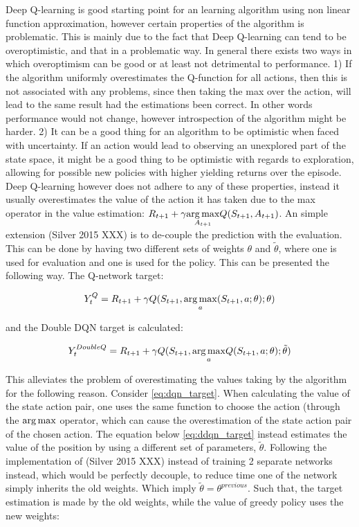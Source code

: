 Deep Q-learning is good starting point for an learning algorithm using non linear function approximation, however certain properties of the algorithm is problematic. This is mainly due to the fact that Deep Q-learning can tend to be overoptimistic, and that in a problematic way. In general there exists two ways in which overoptimism can be good or at least not detrimental to performance. 1) If the algorithm uniformly overestimates the Q-function for all actions, then this is not associated with any problems, since then taking the max over the action, will lead to the same result had the estimations been correct. In other words performance would not change, however introspection of the algorithm might be harder. 2) It can be a good thing for an algorithm to be optimistic when faced with uncertainty. If an action would lead to observing an unexplored part of the state space, it might be a good thing to be optimistic with regards to exploration, allowing for possible new policies with higher yielding returns over the episode. Deep Q-learning however does not adhere to any of these properties, instead it usually overestimates the value of the action it has taken due to the max operator in the value estimation: $R_{t+1} + \gamma \underset{A_{t+1}}{\operatorname*{arg\,max}} Q(S_{t+1}, A_{t+1})$. An simple extension (Silver 2015 XXX) is to de-couple the prediction with the evaluation. This can be done by having two different sets of weights $\theta$ and $\tilde{\theta}$, where one is used for evaluation and one is used for the policy. This can be presented the following way. The Q-network target:

\begin{equation}\label{eq:dqn_target}
    Y_t^{Q} = R_{t+1} + \gamma Q(S_{t+1}, \underset{a}{\operatorname*{arg\,max}} (S_{t+1}, a ; \theta) ; \theta)
\end{equation}

and the Double DQN target is calculated:

\begin{equation}\label{eq:ddqn_target}
    Y_t^{DoubleQ} = R_{t+1} + \gamma Q(S_{t+1}, \underset{a}{\operatorname*{arg\,max}}Q(S_{t+1}, a; \theta); \tilde{\theta}) 
\end{equation}

This alleviates the problem of overestimating the values taking by the algorithm for the following reason. Consider \eqref{eq:dqn_target}. When calculating the value of the state action pair, one uses the same function to choose the action (through the $\operatorname*{arg\,max}$ operator, which can cause the overestimation of the state action pair of the chosen action. The equation below \eqref{eq:ddqn_target} instead estimates the value of the position by using a different set of parameters, $\tilde{\theta}$. Following the implementation of (Silver 2015 XXX) instead of training 2 separate networks instead, which would be perfectly decouple, to reduce time one of the network simply inherits the old weights. Which imply $\tilde{\theta} = \theta^{previous}$. Such that, the target estimation is made by the old weights, while the value of greedy policy uses the new weights:

